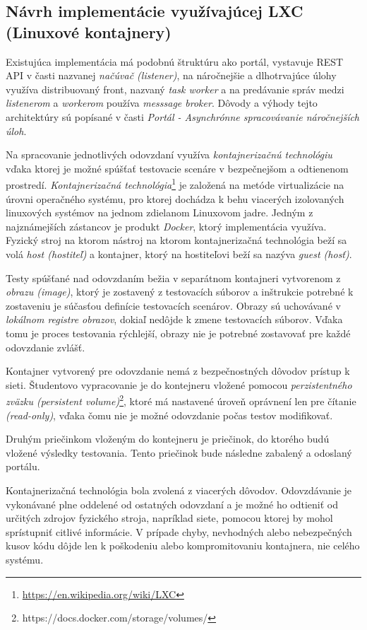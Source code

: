 \documentclass[
  digital, %
  twoside, %
  table,   %
  lof,     %
  lot,     %
]{fithesis3}
\begin{document}
\subsection{Návrh implementácie využívajúcej LXC (Linuxové kontajnery)}

Existujúca implementácia má podobnú štruktúru ako portál, vystavuje REST API v časti nazvanej \emph{načúvač (listener)}, na náročnejšie a dlhotrvajúce úlohy využíva distribuovaný front, nazvaný \emph{task worker} a na predávanie správ medzi \emph{listenerom} a \emph{workerom} používa \emph{messsage broker}.
Dôvody a výhody tejto architektúry sú popísané v časti \emph{Portál - Asynchrónne spracovávanie náročnejších úloh}. 

Na spracovanie jednotlivých odovzdaní využíva \emph{kontajnerizačnú technológiu} vďaka ktorej je možné spúšťať testovacie scenáre v bezpečnejšom a odtienenom prostredí. \emph{Kontajnerizačná technológia}\footnote{\url{https://en.wikipedia.org/wiki/LXC}} je založená na metóde virtualizácie na úrovni operačného systému, pro ktorej dochádza k behu viacerých izolovaných linuxových systémov na jednom zdielanom Linuxovom jadre.
Jedným z najznámejších zástancov je produkt \emph{Docker}, ktorý implementácia využíva. Fyzický stroj na ktorom nástroj na ktorom kontajnerizačná technológia beží sa volá \emph{host (hostiteľ)} a kontajner, ktorý na hostiteľovi beží sa nazýva \emph{guest (hosť)}.

Testy spúšťané nad odovzdaním bežia v separátnom kontajneri vytvorenom z \emph{obrazu (image)}, ktorý je zostavený z testovacích súborov a inštrukcie potrebné k zostaveniu je súčasťou definície testovacích scenárov. Obrazy sú uchovávané v \emph{lokálnom registre obrazov}, dokiaľ nedôjde k zmene testovacích súborov. Vďaka tomu je proces testovania rýchlejší, obrazy nie je potrebné zostavovať pre každé odovzdanie zvlášť.

Kontajner vytvorený pre odovzdanie nemá z bezpečnostných dôvodov prístup k sieti.
Študentovo vypracovanie je do kontejneru vložené pomocou \emph{perzistentného zväzku (persistent volume)}\footnote{https://docs.docker.com/storage/volumes/}, ktoré má nastavené úroveň oprávnení len pre čítanie \emph{(read-only)}, vďaka čomu nie je možné odovzdanie počas testov modifikovať.

Druhým priečinkom vloženým do kontejneru je priečinok, do ktorého budú vložené výsledky testovania. Tento priečinok bude následne zabalený a odoslaný portálu.


Kontajnerizačná technológia bola zvolená z viacerých dôvodov.
Odovzdávanie je vykonávané plne oddelené od ostatných odovzdaní a je možné ho odtieniť od určitých zdrojov fyzického stroja, napríklad siete, pomocou ktorej by mohol sprístupniť citlivé informácie. V prípade chyby, nevhodných alebo nebezpečných kusov kódu dôjde len k poškodeniu alebo kompromitovaniu kontajnera, nie celého systému.
\end{document}
